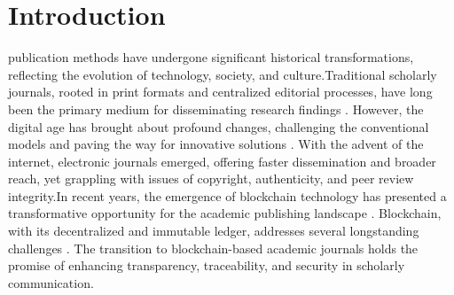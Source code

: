 \documentclass[lettersize,journal]{IEEEtran}
\begin{document}
\section{Introduction}


 publication methods have undergone significant historical transformations, reflecting the evolution of technology, society, and culture.Traditional scholarly journals, rooted in print formats and centralized editorial processes, have long been the primary medium for disseminating research findings \cite{febvre1997coming}. However, the digital age has brought about profound changes, challenging the conventional models and paving the way for innovative solutions \cite{meadows1997communicating}. With the advent of the internet, electronic journals emerged, offering faster dissemination and broader reach, yet grappling with issues of copyright, authenticity, and peer review integrity.In recent years, the emergence of blockchain technology has presented a transformative opportunity for the academic publishing landscape \cite{mougayar2016business}. Blockchain, with its decentralized and immutable ledger, addresses several longstanding challenges \cite{swan2015blockchain}. The transition to blockchain-based academic journals holds the promise of enhancing transparency, traceability, and security in scholarly communication.
\end{document}
